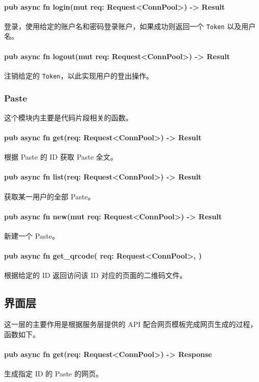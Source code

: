 \documentclass[ichigo,normal,cn]{elegantnote}
\newcommand{\code}[1]{\colorbox{light-gray}{\texttt{#1}}}
\begin{document}
\paragraph{pub async fn login(mut req: Request<ConnPool>) -> Result}
登录，使用给定的账户名和密码登录账户，如果成功则返回一个 \code{Token} 以及用户名。

\paragraph{pub async fn logout(mut req: Request<ConnPool>) -> Result}
注销给定的 \code{Token}，以此实现用户的登出操作。

\subsubsection{Paste}
这个模块内主要是代码片段相关的函数。

\paragraph{pub async fn get(req: Request<ConnPool>) -> Result}
根据 Paste 的 ID 获取 Paste 全文。

\paragraph{pub async fn list(req: Request<ConnPool>) -> Result}
获取某一用户的全部 Paste。

\paragraph{pub async fn new(mut req: Request<ConnPool>) -> Result}
新建一个 Paste。

\paragraph{pub async fn get\_qrcode(
    req: Request<ConnPool>,
)}
根据给定的 ID 返回访问该 ID 对应的页面的二维码文件。

\subsection{界面层}
这一层的主要作用是根据服务层提供的 API 配合网页模板完成网页生成的过程，函数如下。

\paragraph{pub async fn get(req: Request<ConnPool>) -> Response}
生成指定 ID 的 Paste 的网页。
\end{document}
